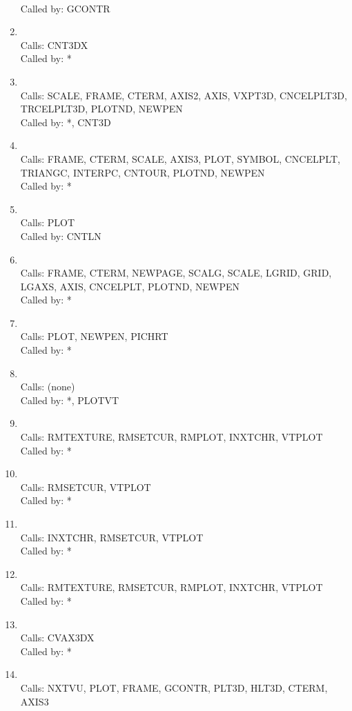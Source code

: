 \documentclass[11pt]{report}
\begin{document}
\begin{enumerate}
\\ Called by: GCONTR
\item {}
\\ Calls:  CNT3DX
\\ Called by: *
\item {}
\\ Calls:  SCALE, FRAME, CTERM, AXIS2, AXIS, VXPT3D, CNCELPLT3D, 
TRCELPLT3D, PLOTND, NEWPEN
\\ Called by: *, CNT3D
\item {}
\\ Calls:  FRAME, CTERM, SCALE, AXIS3, PLOT, SYMBOL, CNCELPLT,
TRIANGC, INTERPC, CNTOUR, PLOTND, NEWPEN
\\ Called by: *
\item {}
\\ Calls:  PLOT
\\ Called by: CNTLN
\item {}
\\ Calls:  FRAME, CTERM, NEWPAGE, SCALG, SCALE, LGRID, GRID,
LGAXS, AXIS, CNCELPLT, PLOTND, NEWPEN
\\ Called by: *
\item {}
\\ Calls:  PLOT, NEWPEN, PICHRT
\\ Called by: *
\item {}
\\ Calls:  (none)
\\ Called by: *, PLOTVT
\item {}
\\ Calls:  RMTEXTURE, RMSETCUR, RMPLOT, INXTCHR, VTPLOT
\\ Called by: *
\item {}
\\ Calls:  RMSETCUR, VTPLOT
\\ Called by: *
\item {}
\\ Calls:  INXTCHR, RMSETCUR, VTPLOT
\\ Called by: *
\item {}
\\ Calls:  RMTEXTURE, RMSETCUR, RMPLOT, INXTCHR, VTPLOT
\\ Called by: *
\item {}
\\ Calls:  CVAX3DX
\\ Called by: *
\item {}
\\ Calls:  NXTVU, PLOT, FRAME, GCONTR, PLT3D, HLT3D, CTERM, AXIS3

\end{enumerate}
\end{document}
